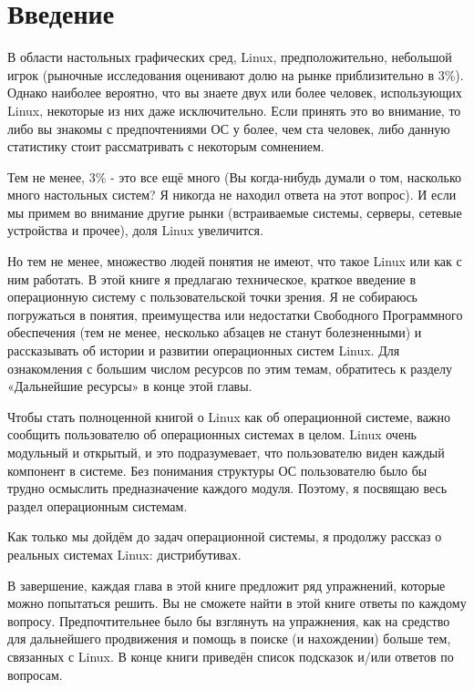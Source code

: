 \documentclass[10pt]{book}
\begin{document}

\onehalfspacing %

\section*{Введение}

В области настольных графических сред, Linux, предположительно, небольшой игрок (рыночные исследования оценивают долю на рынке приблизительно в 3\%). Однако наиболее вероятно, что вы знаете двух или более человек, использующих Linux, некоторые из них даже исключительно. Если принять это во внимание, то либо вы знакомы с предпочтениями ОС у более, чем ста человек, либо данную статистику стоит рассматривать с некоторым сомнением.

Тем не менее, 3\% - это все ещё много (Вы когда-нибудь думали о том, насколько много настольных систем? Я никогда не находил ответа на  этот вопрос). И если мы примем во внимание другие рынки (встраиваемые системы, серверы, сетевые устройства и прочее), доля Linux увеличится.

Но тем не менее, множество людей понятия не имеют, что такое Linux или как с ним работать. В этой книге я предлагаю техническое, краткое введение в операционную систему  с пользовательской точки зрения. Я не собираюсь погружаться в понятия, преимущества или недостатки Свободного Программного обеспечения (тем не менее, несколько абзацев не станут болезненными) и рассказывать об истории и развитии операционных систем Linux. Для ознакомления с большим числом ресурсов по этим темам, обратитесь к разделу «Дальнейшие ресурсы» в конце этой главы.

Чтобы стать полноценной книгой о Linux как об операционной системе, важно сообщить пользователю об операционных системах в целом. Linux очень модульный и открытый, и это подразумевает, что пользователю виден каждый компонент в системе. Без понимания структуры ОС пользователю было бы трудно осмыслить предназначение каждого модуля. Поэтому, я посвящаю весь раздел операционным системам.

Как только мы дойдём до задач операционной системы, я продолжу рассказ о реальных системах Linux: дистрибутивах.

В завершение, каждая глава в этой книге предложит ряд упражнений, которые можно попытаться решить. Вы не сможете найти в этой книге ответы по каждому вопросу. Предпочтительнее было бы взглянуть на упражнения, как на средство для дальнейшего продвижения и помощь в поиске (и нахождении) больше тем, связанных с Linux. В конце книги приведён список подсказок и/или ответов по вопросам.
\end{document}
